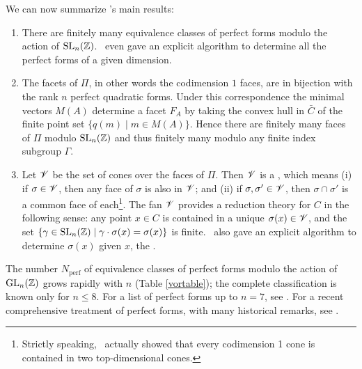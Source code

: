 We can now summarize \Vor 's main results:
\begin{enumerate}
\item There are finitely many equivalence classes of perfect forms
modulo the action of $\operatorname{SL}_{n} (\mathbb{Z})$.  \Vor \ even gave an explicit
algorithm to determine all the perfect forms of a given dimension.
\item \label{item:minvec} The facets of $\Pi$, in other words the
codimension $1$ faces, are in bijection with the rank $n$ perfect
quadratic forms.  Under this correspondence the minimal vectors $M
(A)$ determine a facet $F_{A}$ by taking the convex hull in $\bar C$
of the finite point set $\{q (m)\mid m\in M (A) \}$.  Hence there are
finitely many faces of $\Pi$ modulo $\operatorname{SL}_{n} (\mathbb{Z})$ and thus finitely
many modulo any finite index subgroup $\Gamma$.
\item Let ${\mathscr V}$ be the set of cones over the faces of $\Pi $.  Then ${\mathscr V}$
is a , which means (i) if $\sigma \in {\mathscr V}$, then any face of
$\sigma$ is also in ${\mathscr V}$; and (ii) if $\sigma ,\sigma '\in {\mathscr V}$, then
$\sigma \cap \sigma '$ is a common face of each\footnote{Strictly
speaking, \Vor \ actually showed that every codimension 1 cone is
contained in two top-dimensional cones.}.  The fan ${\mathscr V}$ provides a
reduction theory for $C$ in the following sense: any point $x\in C$ is
contained in a unique $\sigma (x) \in {\mathscr V}$, and the set $\{\gamma \in
\operatorname{SL} _{n} (\mathbb{Z} ) \mid \gamma \cdot \sigma (x) = \sigma (x) \}$ is
finite.  \Vor\ also gave an explicit algorithm to determine $\sigma
(x)$ given $x$, the .
\end{enumerate}

The number $N_{\text{perf}}$ of equivalence classes of perfect forms modulo the
action of $\operatorname{GL}_{n}(\mathbb{Z})$ grows rapidly with
$n$ (Table \ref{vortable}); the complete classification is known
only for $n\leq 8$.  For a list of perfect forms up to $n = 7$, see
\cite{cs}.  For a recent comprehensive treatment of perfect forms,
with many historical remarks, see
\cite{martinet}.


